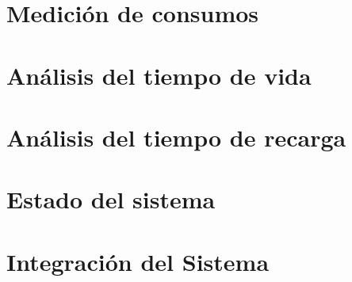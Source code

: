 \section{Medición de consumos}
\label{sec:Medición}

\section{Análisis del tiempo de vida}
\label{sec:vida}

\section{Análisis del tiempo de recarga}
\label{sec:recarga}

\section{Estado del sistema}
\label{sec:estado}

\section{Integración del Sistema}
\label{sec:Integración}

